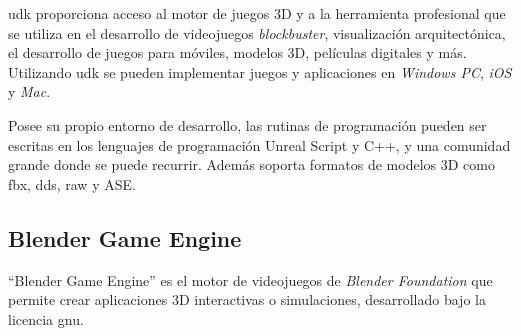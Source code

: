 \Gls{udk} proporciona acceso al motor de juegos 3D y a la herramienta profesional 
que se utiliza en el desarrollo de videojuegos \textit{blockbuster}, visualización 
arquitectónica, el desarrollo de juegos para móviles, modelos 3D, películas digitales 
y más. Utilizando \Gls{udk} se pueden implementar juegos y aplicaciones en
\textit{Windows PC}, \textit{iOS} y \textit{Mac}\cite{unrealengine}.

Posee su propio entorno de desarrollo, las rutinas de programación pueden ser escritas 
en los lenguajes de programación Unreal Script y C++, y una comunidad 
grande donde se puede recurrir. Además soporta formatos de modelos 
3D como fbx, dds, raw y ASE\cite{unrealengine}.






\subsection{Blender Game Engine}


\enquote{Blender Game Engine} es el motor de videojuegos de \textit{Blender Foundation} 
que permite crear aplicaciones 3D interactivas o simulaciones, desarrollado bajo 
la licencia \Gls{gnu}\cite{blender}.

